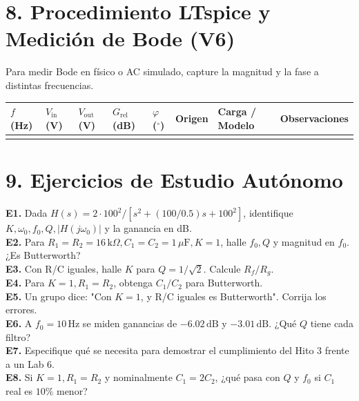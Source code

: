 \documentclass[10pt, a4paper]{article}
\begin{document}
\section*{8. Procedimiento LTspice y Medición de Bode (V6)}
Para medir Bode en físico o AC simulado, capture la magnitud y la fase a distintas frecuencias.
\begin{table}[htbp]
    \centering
    \scriptsize
    \renewcommand{\arraystretch}{1.4}
    \begin{tabularx}{\textwidth}{|P{1.2cm}|P{1.2cm}|P{1.2cm}|P{1.5cm}|P{1.5cm}|P{1.5cm}|P{2cm}|Y|}
    \hline
    \textbf{$f$ (Hz)} & \textbf{$V_{\mathrm{in}}$ (V)} & \textbf{$V_{\mathrm{out}}$ (V)} & \textbf{$G_{\mathrm{rel}}$ (dB)} & \textbf{$\varphi$ ($^\circ$)} & \textbf{Origen} & \textbf{Carga / Modelo} & \textbf{Observaciones} \\ \hline
     & & & & & & & \\ \hline
    \end{tabularx}
\end{table}

\section*{9. Ejercicios de Estudio Autónomo}
\textbf{E1.} Dada $H(s)=2\cdot 100^2 / [s^2 + (100/0.5)s + 100^2]$, identifique $K, \omega_0, f_0, Q, |H(j\omega_0)|$ y la ganancia en dB.\\
\textbf{E2.} Para $R_1=R_2=16\,\mathrm{k}\Omega, C_1=C_2=1\,\mu\mathrm{F}, K=1$, halle $f_0, Q$ y magnitud en $f_0$. ¿Es Butterworth?\\
\textbf{E3.} Con R/C iguales, halle $K$ para $Q=1/\sqrt{2}$. Calcule $R_f/R_g$.\\
\textbf{E4.} Para $K=1, R_1=R_2$, obtenga $C_1/C_2$ para Butterworth.\\
\textbf{E5.} Un grupo dice: "Con $K=1$, y R/C iguales es Butterworth". Corrija los errores.\\
\textbf{E6.} A $f_0=10\,\mathrm{Hz}$ se miden ganancias de $-6.02\,\mathrm{dB}$ y $-3.01\,\mathrm{dB}$. ¿Qué $Q$ tiene cada filtro?\\
\textbf{E7.} Especifique qué se necesita para demostrar el cumplimiento del Hito 3 frente a un Lab 6.\\
\textbf{E8.} Si $K=1, R_1=R_2$ y nominalmente $C_1=2C_2$, ¿qué pasa con $Q$ y $f_0$ si $C_1$ real es $10\%$ menor?
\end{document}
